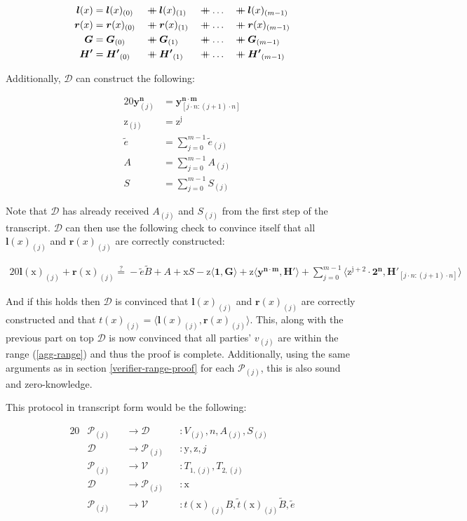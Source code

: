 \documentclass{article}
\newcommand{\eq}[1]{\begin{alignat*}{20}#1\end{alignat*}}
\renewcommand{\vec}[1]{\boldsymbol{#1}}
\newcommand{\ran}[1]{\mathrm{#1}}
\newcommand{\vecran}[1]{\mathbf{#1}}
\newcommand{\V}{\mathcal{V}}
\renewcommand{\P}{\mathcal{P}}
\newcommand{\D}{\mathcal{D}}
\newcommand\concat{\mathbin{+\mkern-10mu+}} %
\newcommand{\dotp}[2]{\langle #1, #2 \rangle}
\newcommand{\blind}[1]{\widetilde{#1}}
\newcommand{\bt}{\blind{t}}
\newcommand{\bB}{\blind{B}}
\newcommand{\be}{\blind{e}}
\begin{document}
\eq{
	\vec{l}(x) &= \vec{l}(x)_{(0)} &&\concat \vec{l}(x)_{(1)} &&\concat \dots &&\concat \vec{l}(x)_{(m-1)}\\
	\vec{r}(x) &= \vec{r}(x)_{(0)} &&\concat \vec{r}(x)_{(1)} &&\concat \dots &&\concat \vec{r}(x)_{(m-1)}\\
	\vec{G}    &= \vec{G}_{(0)}    &&\concat \vec{G}_{(1)}    &&\concat \dots &&\concat \vec{G}_{(m-1)}\\
	\vec{H'}   &= \vec{H'}_{(0)}   &&\concat \vec{H'}_{(1)}   &&\concat \dots &&\concat \vec{H'}_{(m-1)}
}

Additionally, $\D$ can construct the following:

\eq{
	\vecran{y}^{\vec{n}}_{(j)} &= \vecran{y}^{\vec{n \cdot m}}_{[j \cdot n : (j+1) \cdot n]}\\
	\ran{z_{(j)}}      &= \ran{z^j}\\
	\be      &= \sum^{m-1}_{j = 0} \be_{(j)}\\
	A                  &= \sum^{m-1}_{j = 0} A_{(j)}\\
	S                  &= \sum^{m-1}_{j = 0} S_{(j)}
}

Note that $\D$ has already received $A_{(j)}$ and $S_{(j)}$ from the
first step of the transcript. $\D$ can then use the following check
to convince itself that all $\vec{l}(x)_{(j)}$ and $\vec{r}(x)_{(j)}$
are correctly constructed:

\eq{
	\vec{l}(\ran{x})_{(j)} + \vec{r}(\ran{x})_{(j)} \stackrel{?}{=}
	-\be\bB + A + \ran{x}S - \ran{z}\dotp{\vec{1}}{\vec{G}} +
	\ran{z}\dotp{\vecran{y}^{\vec{n \cdot m}}}{\vec{H'}} +
	\sum^{m-1}_{j = 0}\dotp{\ran{z^{j+2}} \cdot \vec{2^n}}{\vec{H'}_{[j \cdot n: (j+1) \cdot n]}}
}

And if this holds then $\D$ is convinced that $\vec{l}(x)_{(j)}$ and
$\vec{r}(x)_{(j)}$ are correctly constructed and that $t(x)_{(j)}
= \dotp{\vec{l}(x)_{(j)}}{\vec{r}(x)_{(j)}}$. This, along with
the previous part on top $\D$ is now convinced that all parties'
$v_{(j)}$ are within the range (\ref{agg-range}) and thus the proof
is complete. Additionally, using the same arguments as in section
\ref{verifier-range-proof} for each $\P_{(j)}$, this is also sound
and zero-knowledge.

This protocol in transcript form would be the following: 

\eq{
	&\P_{(j)} &&\rightarrow \D &&: V_{(j)}, n, A_{(j)}, S_{(j)} \\
	&\D &&\rightarrow \P_{(j)} &&: \ran{y}, \ran{z}, j \\
	&\P_{(j)} &&\rightarrow \V &&: T_{1, (j)}, T_{2,(j)} \\
	&\D &&\rightarrow \P_{(j)} &&: \ran{x} \\
	&\P_{(j)} &&\rightarrow \V &&: t(\ran{x})_{(j)} B, \bt(\ran{x})_{(j)}\bB, \be
}
\end{document}
